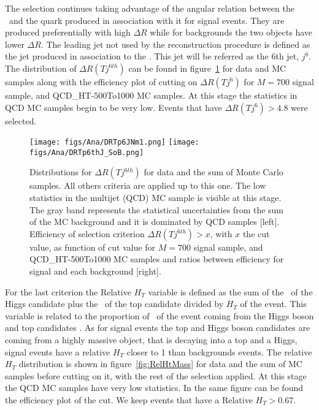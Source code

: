 The selection continues taking advantage of the angular relation between the \Tp~and the quark produced in association with it for signal events. They are produced preferentially with high $\Delta R$ while for backgrounds the two objects have lower $\Delta R$. The leading jet not used by the reconstruction procedure is defined as the jet produced in association to the \Tp. This jet will be referred as the 6th jet, $j^{6}$. The distribution of $\Delta R (T j^{6th})$ can be found in figure~\ref{fig:jet6} for data and MC samples along with the efficiency plot of cutting on $\Delta R (T j^{6})$ for $M=700$ \GeVcc signal sample, \ttbar and QCD\_HT-500To1000 MC samples. At this stage the statistics in QCD MC samples begin to be very low. Events that have $\Delta R (T j^{6})>4.8$ were selected. 

\begin{figure}[!Hhtbp]
  \begin{center}
    \texttt{[image: figs/Ana/DRTp6JNm1.png]}
    \texttt{[image: figs/Ana/DRTp6thJ\_SoB.png]}
    \caption{Distributions for $\Delta R (T j^{6th})$  for data and the sum of Monte Carlo samples. All others criteria are applied up to this one. The low statistics in the multijet (QCD) MC sample is visible at this stage. The gray band represents the statistical uncertainties from the sum of the MC background and it is dominated by QCD samples [left]. Efficiency of selection criterion $\Delta R (T j^{6th})>x$, with $x$ the cut value, as function of cut value for $M=700$ \GeVcc signal sample, \ttbar and QCD\_HT-500To1000 MC samples and ratios between efficiency for signal and each background [right].}
    \label{fig:jet6}
  \end{center}
\end{figure}

For the last criterion the Relative $H_{T}$ variable is defined as the sum of the \pt~of the Higgs candidate plus the \pt~of the top candidate divided by $H_{T}$ of the event. This variable is related to the proportion of \HT~of the event coming from the Higgs boson and top candidates \pt. As for signal events the top and Higgs boson candidates are coming from a highly massive object, that is decaying into a top and a Higgs, signal events have a relative $H_{T}$ closer to 1 than backgrounds events. The relative $H_{T}$ distribution is shown in figure~\ref{fig:RelHtMass} for data and the sum of MC samples before cutting on it, with the rest of the selection applied. At this stage the QCD MC samples have very low statistics. In the same figure can be found the efficiency plot of the cut. We keep events that have a Relative $H_{T}>0.67$. 

